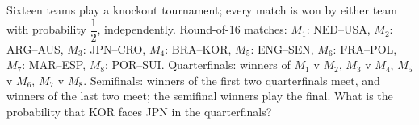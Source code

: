 Sixteen teams play a knockout tournament; every match is won by either team with probability $\dfrac12$, independently. Round-of-16 matches: $M_1$: NED--USA, $M_2$: ARG--AUS, $M_3$: JPN--CRO, $M_4$: BRA--KOR, $M_5$: ENG--SEN, $M_6$: FRA--POL, $M_7$: MAR--ESP, $M_8$: POR--SUI. Quarterfinals: winners of $M_1$ v $M_2$, $M_3$ v $M_4$, $M_5$ v $M_6$, $M_7$ v $M_8$. Semifinals: winners of the first two quarterfinals meet, and winners of the last two meet; the semifinal winners play the final. What is the probability that KOR faces JPN in the quarterfinals?
